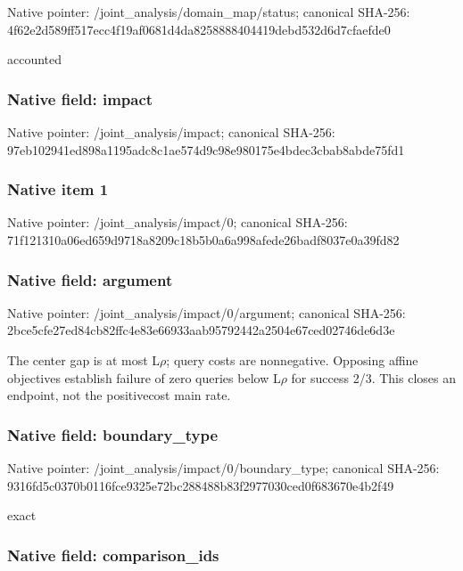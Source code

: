 \documentclass[10pt,a4paper]{article}
\begin{document}
Native pointer: /joint\_analysis/domain\_map/status; canonical SHA-256: 4f62e2d589ff517ecc4f19af\allowbreak{}0681d4da8258888404419deb\allowbreak{}d532d6d7cfaefde0


accounted


\subsubsection{Native field: impact}


Native pointer: /joint\_analysis/impact; canonical SHA-256: 97eb102941ed898a1195adc8\allowbreak{}c1ae574d9c98e980175e4bde\allowbreak{}c3cbab8abde75fd1



\subsubsection{Native item 1}


Native pointer: /joint\_analysis/impact/0; canonical SHA-256: 71f121310a06ed659d9718a8\allowbreak{}209c18b5b0a6a998afede26b\allowbreak{}adf8037e0a39fd82



\subsubsection{Native field: argument}


Native pointer: /joint\_analysis/impact/0/argument; canonical SHA-256: 2bce5cfe27ed84cb82ffc4e8\allowbreak{}3e66933aab95792442a2504e\allowbreak{}67ced02746de6d3e


The center gap is at most L\ensuremath{\rho}; query costs are nonnegative. Opposing affine objectives establish failure of zero queries below L\ensuremath{\rho} for success 2/3. This closes an endpoint, not the positivecost main rate.


\subsubsection{Native field: boundary\_type}


Native pointer: /joint\_analysis/impact/0/boundary\_type; canonical SHA-256: 9316fd5c0370b0116fce9325\allowbreak{}e72bc288488b83f2977030ce\allowbreak{}d0f683670e4b2f49


exact


\subsubsection{Native field: comparison\_ids}
\end{document}
